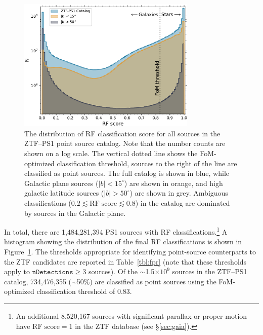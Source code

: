 \documentclass[twocolumn]{aastex62}
\begin{document}
\begin{CJK*}{UTF8}{gbsn}
\begin{figure}[htb]
 \centering
  \includegraphics[width=3.35in]{./Figures/ZTF_PS1_cat_hist.pdf}
  \caption{ The distribution of RF classification score for all sources in
  the ZTF--PS1 point source catalog. Note that the number counts are shown on
  a log scale. The vertical dotted line shows the FoM-optimized
  classification threshold, sources to the right of the line are classified
  as point sources. The full catalog is shown in blue, while Galactic plane
  sources ($|b| < 15^{\circ}$) are shown in orange, and high galactic
  latitude sources ($|b| > 50^{\circ}$) are shown in grey. Ambiguous
  classifications ($0.2 \lesssim \mathrm{RF\;score} \lesssim 0.8$) in the
  catalog are dominated by sources in the Galactic plane.}
  \label{fig:ztf_hist}
\end{figure}

In total, there are 1,484,281,394 PS1 sources with RF
classifications.\footnote{An additional 8,520,167 sources with
significant parallax or proper motion have $\mathrm{RF\;score} = 1$ in the
ZTF database (see \S\ref{sec:gaia}).} A histogram showing the distribution
of the final RF classifications is shown in Figure~\ref{fig:ztf_hist}. The
thresholds appropriate for identifying point-source counterparts to the ZTF
candidates are reported in Table~\ref{tbl:fpr} (note that these thresholds
apply to $\mathtt{nDetections} \ge 3$ sources). Of the $\sim$1.5$\times
10^{9}$ sources in the ZTF--PS1 catalog, 734,476,355 ($\sim$50\%) are
classified as point sources using the FoM-optimized classification threshold of 0.83.


\end{CJK*}
\end{document}
